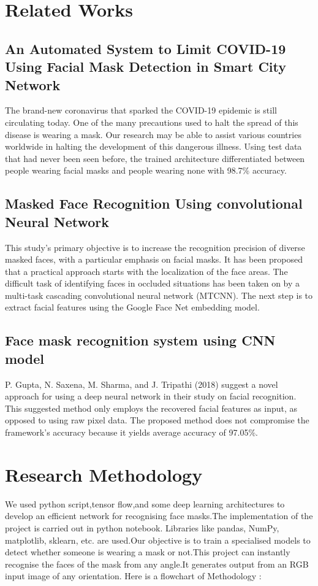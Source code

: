 \documentclass[conference]{IEEEtran}
\begin{document}
\section{Related Works}

\subsection{An Automated System to Limit COVID-19 Using Facial Mask Detection in Smart City Network\cite{b1}}

The brand-new coronavirus that sparked the COVID-19 epidemic is still circulating today. One of the many precautions used to halt the spread of this disease is wearing a mask. Our research may be able to assist various countries worldwide in halting the development of this dangerous illness. Using test data that had never been seen before, the trained architecture differentiated between people wearing facial masks and people wearing none with 98.7\% accuracy.

\subsection{Masked Face Recognition Using convolutional Neural Network\cite{b2}}
This study's primary objective is to increase the recognition precision of diverse masked faces, with a particular emphasis on facial masks. It has been proposed that a practical approach starts with the localization of the face areas. The difficult task of identifying faces in occluded situations has been taken on by a multi-task cascading convolutional neural network (MTCNN). The next step is to extract facial features using the Google Face Net embedding model.

\subsection{Face mask recognition system using CNN model\cite{b3}}
P. Gupta, N. Saxena, M. Sharma, and J. Tripathi (2018) suggest a novel approach for using a deep neural network in their study on facial recognition. This suggested method only employs the recovered facial features as input, as opposed to using raw pixel data. The proposed method does not compromise the framework's accuracy because it yields average accuracy of 97.05\%.

\section{Research Methodology}
We used python script,tensor flow,and some deep learning architectures to develop an efficient network for recognising face masks.The implementation of the project is carried out in python notebook. Libraries like pandas, NumPy, matplotlib, sklearn, etc. are used.Our objective is to train a specialised models to detect whether someone is wearing a mask or not.This project can instantly recognise the faces of the mask from any angle.It generates output from an RGB input image of any orientation.
Here is a flowchart of Methodology :
\end{document}

